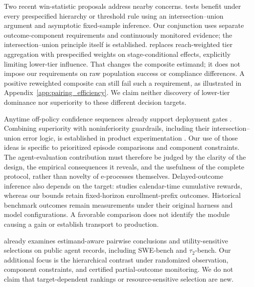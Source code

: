 \documentclass[11pt,letterpaper]{article}
\begin{document}
Two recent win-statistic proposals address nearby concerns.
\citet{li2026worstcase} tests benefit under every prespecified hierarchy
or threshold rule using an intersection--union argument and asymptotic
fixed-sample inference. Our conjunction uses separate outcome-component
requirements and continuously monitored evidence; the intersection--union
principle itself is established. \citet{mccoy2026psnb} replaces
reach-weighted tier aggregation with prespecified weights on
stage-conditional effects, explicitly limiting lower-tier influence.
That changes the composite estimand; it does not impose our requirements
on raw population success or compliance differences. A positive
reweighted composite can still fail such a requirement, as illustrated
in Appendix~\ref{app:pairing_efficiency}. We claim neither discovery of
lower-tier dominance nor superiority to these different decision targets.

Anytime off-policy confidence sequences already support deployment gates
\citep{karampatziakis2021offpolicy}. Combining superiority with
noninferiority guardrails, including their intersection--union error
logic, is established in product experimentation
\citep{schultzberg2024riskaware}. Our use of those ideas is specific to
prioritized episode comparisons and component constraints. The
agent-evaluation contribution must therefore be judged by the clarity
of the design, the empirical consequences it reveals, and the usefulness
of the complete protocol, rather than novelty of e-processes themselves.
Delayed-outcome inference also depends on the target:
\citet{lindon2026delayed} studies calendar-time cumulative rewards,
whereas our bounds retain fixed-horizon enrollment-prefix outcomes.
Historical benchmark outcomes remain measurements under their original
harness and model configurations. A favorable comparison does not
identify the module causing a gain or establish transport to production.

\citet{huang2026leaderboard} already examines estimand-aware pairwise
conclusions and utility-sensitive selections on public agent records,
including SWE-bench and $\tau_2$-bench. Our additional focus is the
hierarchical contrast under randomized observation, component constraints,
and certified partial-outcome monitoring. We do not claim that
target-dependent rankings or resource-sensitive selection are new.
\end{document}
